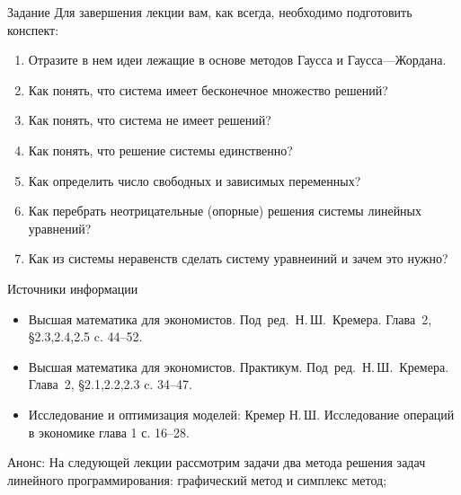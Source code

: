 \documentclass[unicode,11pt,notheorems]{beamer}
\begin{document}
\begin{frame}{Задание}
Для завершения лекции вам, как всегда, необходимо подготовить конспект:
	\begin{enumerate}
		\item 
			Отразите в нем идеи лежащие в основе методов Гаусса и Гаусса---Жордана.
		\item 
			Как понять, что система имеет бесконечное множество решений?
		\item 
			Как понять, что система не имеет решений?
		\item 
			Как понять, что решение системы единственно?
		\item 
			Как определить число свободных и зависимых переменных?
		\item 
			Как перебрать неотрицательные (опорные) решения системы линейных уравнений?
		\item 
			Как из системы неравенств сделать систему уравнеиний и зачем это нужно?
	\end{enumerate}
\end{frame}
\begin{frame}{Источники информации}
\begin{itemize}
\item 
	Высшая математика для экономистов. Под~ред.~Н.\,Ш.~Кремера. Глава~2, \S 2.3,2.4,2.5 c. 44--52.
\item 
	Высшая математика для экономистов. Практикум. Под~ред.~Н.\,Ш.~Кремера.  Глава~2, \S 2.1,2.2,2.3 c. 34--47.
\item 
	Исследование и оптимизация моделей:  Кремер  Н.\,Ш. Исследование операций в экономике глава 1 с. 16--28.
\end{itemize}

\end{frame}

\begin{frame}{Анонс:}
	На следующей лекции рассмотрим задачи два метода решения задач линейного программирования: графический метод и симплекс метод;

\end{frame}
\end{document}

